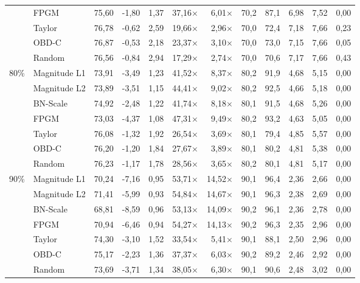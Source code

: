 \begin{table}[H]
{{\begin{tabular}{c l rr rrr rr rrr}
     & FPGM & 75,60 & -1,80 & 1,37 & 37,16$\times$ & 6,01$\times$ & 70,2 & 87,1 & 6,98 & 7,52 & 0,00 \\
     & Taylor & 76,78 & -0,62 & 2,59 & 19,66$\times$ & 2,96$\times$ & 70,0 & 72,4 & 7,18 & 7,66 & 0,23 \\
     & OBD-C & 76,87 & -0,53 & 2,18 & 23,37$\times$ & 3,10$\times$ & 70,0 & 73,0 & 7,15 & 7,66 & 0,05 \\
     & Random & 76,56 & -0,84 & 2,94 & 17,29$\times$ & 2,74$\times$ & 70,0 & 70,6 & 7,17 & 7,66 & 0,43 \\
    \midrule
    \multirow{7}{*}{80\%} & Magnitude L1 & 73,91 & -3,49 & 1,23 & 41,52$\times$ & 8,37$\times$ & 80,2 & 91,9 & 4,68 & 5,15 & 0,00 \\
     & Magnitude L2 & 73,89 & -3,51 & 1,15 & 44,41$\times$ & 9,02$\times$ & 80,2 & 92,5 & 4,66 & 5,18 & 0,00 \\
     & BN-Scale & 74,92 & -2,48 & 1,22 & 41,74$\times$ & 8,18$\times$ & 80,1 & 91,5 & 4,68 & 5,26 & 0,00 \\
     & FPGM & 73,03 & -4,37 & 1,08 & 47,31$\times$ & 9,49$\times$ & 80,2 & 93,2 & 4,63 & 5,05 & 0,00 \\
     & Taylor & 76,08 & -1,32 & 1,92 & 26,54$\times$ & 3,69$\times$ & 80,1 & 79,4 & 4,85 & 5,57 & 0,00 \\
     & OBD-C & 76,20 & -1,20 & 1,84 & 27,67$\times$ & 3,89$\times$ & 80,1 & 80,2 & 4,81 & 5,38 & 0,00 \\
     & Random & 76,23 & -1,17 & 1,78 & 28,56$\times$ & 3,65$\times$ & 80,2 & 80,1 & 4,81 & 5,17 & 0,00 \\
    \midrule
    \multirow{7}{*}{90\%} & Magnitude L1 & 70,24 & -7,16 & 0,95 & 53,71$\times$ & 14,52$\times$ & 90,1 & 96,4 & 2,36 & 2,66 & 0,00 \\
     & Magnitude L2 & 71,41 & -5,99 & 0,93 & 54,84$\times$ & 14,67$\times$ & 90,1 & 96,3 & 2,38 & 2,69 & 0,00 \\
     & BN-Scale & 68,81 & -8,59 & 0,96 & 53,13$\times$ & 14,09$\times$ & 90,2 & 96,1 & 2,36 & 2,78 & 0,00 \\
     & FPGM & 70,94 & -6,46 & 0,94 & 54,27$\times$ & 14,13$\times$ & 90,2 & 96,3 & 2,35 & 2,96 & 0,00 \\
     & Taylor & 74,30 & -3,10 & 1,52 & 33,54$\times$ & 5,41$\times$ & 90,1 & 88,1 & 2,50 & 2,96 & 0,00 \\
     & OBD-C & 75,17 & -2,23 & 1,36 & 37,37$\times$ & 6,03$\times$ & 90,2 & 89,2 & 2,46 & 2,92 & 0,00 \\
     & Random & 73,69 & -3,71 & 1,34 & 38,05$\times$ & 6,30$\times$ & 90,1 & 90,6 & 2,48 & 3,02 & 0,00 \\
    \bottomrule
  \end{tabular}}}
\end{table}
